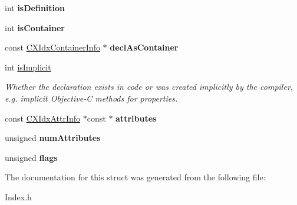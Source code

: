 \begin{DoxyCompactItemize}
int {\bfseries is\+Definition}
\item 
\mbox{\label{structCXIdxDeclInfo_adfe3f4ae193d95fa63a1982d5253b927}} 
int {\bfseries is\+Container}
\item 
\mbox{\label{structCXIdxDeclInfo_a76cc2299b11b6385f1f2200cd6a6f026}} 
const \mbox{\hyperlink{structCXIdxContainerInfo}{C\+X\+Idx\+Container\+Info}} $\ast$ {\bfseries decl\+As\+Container}
\item 
\mbox{\label{structCXIdxDeclInfo_a111db4f86cbc1334d47bc413058373d6}} 
int \mbox{\hyperlink{structCXIdxDeclInfo_a111db4f86cbc1334d47bc413058373d6}{is\+Implicit}}
\begin{DoxyCompactList}\small\item\em Whether the declaration exists in code or was created implicitly by the compiler, e.\+g. implicit Objective-\/C methods for properties. \end{DoxyCompactList}\item 
\mbox{\label{structCXIdxDeclInfo_ac0b1c1b62c5b12b6493c145b7821966b}} 
const \mbox{\hyperlink{structCXIdxAttrInfo}{C\+X\+Idx\+Attr\+Info}} $\ast$const  $\ast$ {\bfseries attributes}
\item 
\mbox{\label{structCXIdxDeclInfo_ab366b0e67cd492f1a7fa9eb2d19239cf}} 
unsigned {\bfseries num\+Attributes}
\item 
\mbox{\label{structCXIdxDeclInfo_a54c8ca818a9f2ffbfc530d8bd0a61308}} 
unsigned {\bfseries flags}
\end{DoxyCompactItemize}


The documentation for this struct was generated from the following file\+:\begin{DoxyCompactItemize}
\item 
Index.\+h\end{DoxyCompactItemize}
